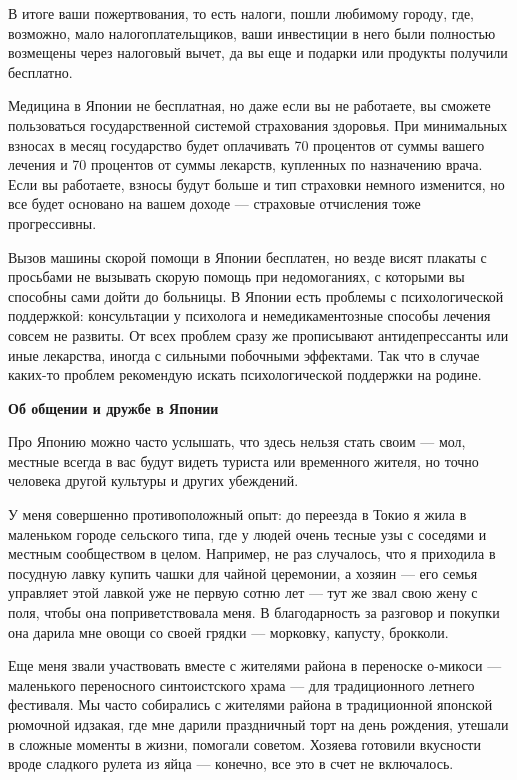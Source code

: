 В итоге ваши пожертвования, то есть налоги, пошли любимому городу, где, возможно, мало налогоплательщиков, ваши инвестиции в него были полностью возмещены через налоговый вычет, да вы еще и подарки или продукты получили бесплатно.

Медицина в Японии не бесплатная, но даже если вы не работаете, вы сможете пользоваться государственной системой страхования здоровья. При минимальных взносах в месяц государство будет оплачивать 70 процентов от суммы вашего лечения и 70 процентов от суммы лекарств, купленных по назначению врача. Если вы работаете, взносы будут больше и тип страховки немного изменится, но все будет основано на вашем доходе — страховые отчисления тоже прогрессивны.

Вызов машины скорой помощи в Японии бесплатен, но везде висят плакаты с просьбами не вызывать скорую помощь при недомоганиях, с которыми вы способны сами дойти до больницы. В Японии есть проблемы с психологической поддержкой: консультации у психолога и немедикаментозные способы лечения совсем не развиты. От всех проблем сразу же прописывают антидепрессанты или иные лекарства, иногда с сильными побочными эффектами. Так что в случае каких-то проблем рекомендую искать психологической поддержки на родине.

\newpage
\textbf{Об общении и дружбе в Японии}

Про Японию можно часто услышать, что здесь нельзя стать своим — мол, местные всегда в вас будут видеть туриста или временного жителя, но точно человека другой культуры и других убеждений.

У меня совершенно противоположный опыт: до переезда в Токио я жила в маленьком городе сельского типа, где у людей очень тесные узы с соседями и местным сообществом в целом. Например, не раз случалось, что я приходила в посудную лавку купить чашки для чайной церемонии, а хозяин — его семья управляет этой лавкой уже не первую сотню лет — тут же звал свою жену с поля, чтобы она поприветствовала меня. В благодарность за разговор и покупки она дарила мне овощи со своей грядки — морковку, капусту, брокколи.

Еще меня звали участвовать вместе с жителями района в переноске о-микоси — маленького переносного синтоистского храма — для традиционного летнего фестиваля. Мы часто собирались с жителями района в традиционной японской рюмочной идзакая, где мне дарили праздничный торт на день рождения, утешали в сложные моменты в жизни, помогали советом. Хозяева готовили вкусности вроде сладкого рулета из яйца — конечно, все это в счет не включалось.

